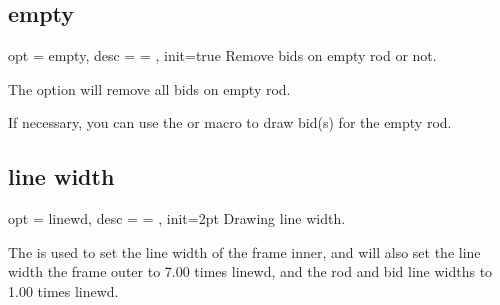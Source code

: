 \documentclass[full]{l3doc}
\begin{document}
\begin{documentation}
\begin{SideBySideExample}[frame=single,numbers=left,%
                xrightmargin=.53\linewidth,gobble=2]
  \centering
  \begin{suanpan}[draft]
  \end{suanpan}
\end{SideBySideExample}

\subsection{empty}

\begin{option}{ opt = empty, desc = {= }, init=true }
  Remove bids on empty rod or not.
\end{option}

  The  option will remove all bids on empty rod.

  \begin{noteen}
    If necessary, you can use the  or  macro to
    draw bid(s) for the empty rod.
  \end{noteen}

\begin{SideBySideExample}[frame=single,numbers=left,%
                xrightmargin=.53\linewidth,gobble=2]
  \centering
  \begin{suanpan}[empty=false]
  \end{suanpan}
\end{SideBySideExample}

\subsection{line width}

\begin{option}{ opt = linewd, desc = {= }, init=2pt }
  Drawing line width.
\end{option}

  The  is used to set the line width of the frame inner,
  and will also set the line width the frame outer to 7.00 times linewd,
  and the rod and bid line widths to 1.00 times linewd.

\begin{SideBySideExample}[frame=single,numbers=left,%
                xrightmargin=.40\linewidth,gobble=2]
  \centering
  \begin{suanpan}
  \end{suanpan}
\end{SideBySideExample}


\end{documentation}
\end{document}

